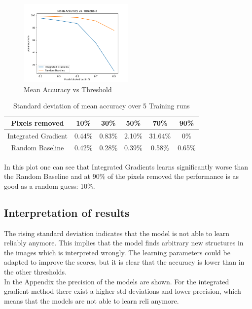 \documentclass[conference]{IEEEtran}
\begin{document}
\begin{figure}[h]
	\centering
	\includegraphics[width=0.5\textwidth]{figs/mean_accuracy_vs_threshold.png}
	\caption{Mean Accuracy vs Threshold}
	\label{fig:mean_accuracy}
\end{figure}

\begin{table}[ht]
	\centering
	\begin{tabular}{|c|c|c|c|c|c|}
		\hline
		Pixels removed & 10\% & 30\% & 50\% & 70\% & 90\% \\
		\hline
		Integrated Gradient & 0.44\% & 0.83\% & 2.10\% & 31.64\% & 0\% \\
		Random Baseline  & 0.42\% & 0.28\% & 0.39\% & 0.58\% & 0.65\% \\
		\hline	
	\end{tabular} \newline
	
	\caption{Standard deviation of mean accuracy over 5 Training runs}
	\label{tab:std_deviation}
\end{table}

In this plot one can see that Integrated Gradients learns significantly worse than the Random Baseline and at 90\% of the pixels removed the performance is as good as a random guess: 10\%.



\subsection{Interpretation of results}

The rising standard deviation indicates that the model is not able to learn reliably anymore. This implies that the model finds arbitrary new structures in the images which is interpreted wrongly. The learning parameters could be adapted to improve the scores, but it is clear that the accuracy is lower than in the other thresholds.
\\
In the Appendix the precision of the models are shown. For the integrated gradient method there exist a higher std deviations and lower precision, which means that the models are not able to learn reli anymore.
\end{document}
